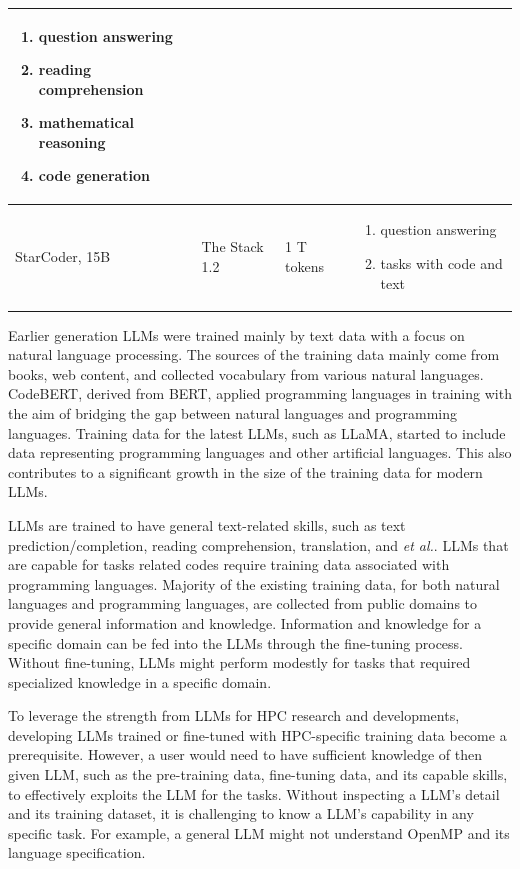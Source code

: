 \begin{table}[htbp]
\begin{tabular}{|p{2.5cm}|p{3.5cm}|p{2.2cm}|p{3.5cm}|}
\begin{enumerate}
    \item question answering
    \item reading comprehension
    \item mathematical reasoning
    \item code generation
\end{enumerate}
\\ \hline
StarCoder, 15B & The Stack 1.2 & 1 T tokens & 
\begin{enumerate}
    \item question answering
    \item tasks with code and text
\end{enumerate}
\\ \hline
\end{tabular}
\end{table}
Earlier generation LLMs were trained mainly by text data with a focus on natural language processing.  The sources of the training data mainly come from books, web content, and collected vocabulary from various natural languages. 
CodeBERT, derived from BERT, applied programming languages in training with the aim of bridging the gap between natural languages and programming languages.
Training data for the latest LLMs, such as LLaMA, started to include data representing programming languages and other artificial languages.  This also contributes to a significant growth in the size of the training data for modern LLMs.

LLMs are trained to have general text-related skills, such as text prediction/completion, reading comprehension, translation, and \textit{et al.}.  
LLMs that are capable for tasks related codes require training data associated with programming languages.  
Majority of the existing training data, for both natural languages and programming languages, are collected from public domains to provide general information and knowledge. 
Information and knowledge for a specific domain can be fed into the LLMs through the fine-tuning process. 
Without fine-tuning, LLMs might perform modestly for tasks that required specialized knowledge in a specific domain.  

To leverage the strength from LLMs for HPC research and developments, developing LLMs trained or fine-tuned with HPC-specific training data become a prerequisite.
However, a user would need to have sufficient knowledge of then given LLM, such as the pre-training data, fine-tuning data, and its capable skills, to effectively exploits the LLM for the tasks.
Without inspecting a LLM's detail and its training dataset, it is challenging to know a LLM's capability in any specific task. 
For example, a general LLM might not understand OpenMP and its language specification.  

